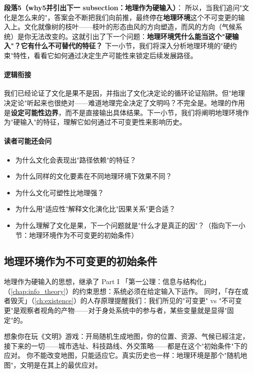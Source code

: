 \documentclass[../main.tex]{subfiles}
\begin{document}
	\textbf{段落5（why5并引出下一 subsection：地理作为硬输入）}：  
	所以，当我们追问"文化是怎么来的"，答案会不断把我们向前推，最终停在\textbf{地理环境}这个不可变更的输入上。文化就像树的枝叶——枝叶的形态由风的方向塑造，而风的方向（气候系统）是你无法改变的。这就引出了下一个问题：\textbf{地理环境凭什么能当这个"硬输入"？它有什么不可替代的特征？} 下一小节，我们将深入分析地理环境的"硬约束"特性，看看它如何通过决定生产可能性来锁定后续发展路径。
	
	\paragraph*{逻辑衔接}
	我们已经论证了文化是果不是因，并指出了文化决定论的循环论证陷阱。但"地理决定论"听起来也很绝对——难道地理完全决定了文明吗？不完全是。地理的作用是\textbf{设定可能性边界}，而不是直接输出具体结果。下一小节，我们将阐明地理环境作为"硬输入"的特征，理解它如何通过不可变更性来影响历史。
	
	\paragraph*{读者可能还会问}
	\begin{itemize}
\item 为什么文化会表现出"路径依赖"的特征？
	\item 为什么同样的文化要素在不同地理环境下效果不同？
	\item 为什么文化可塑性比地理强？
	\item 为什么用"适应性"解释文化演化比"因果关系"更合适？
	\item 为什么理解了文化是果，下一个问题就是"什么才是真正的因"？（指向下一小节：地理环境作为不可变更的初始条件）
\end{itemize}
	
	\subsection{地理环境作为不可变更的初始条件}
	
	

\begin{readingnote}
		地理作为硬输入的思想，继承了 Part I 「第一公理：信息与结构化」（\ref{chap:info_theory}）的约束思想：系统必须在给定输入下运作。
	同时，「存在或者毁灭」（\ref{ch:existence}）的人存原理提醒我们：我们所见的"可变更" vs "不可变更"是观察者视角的产物——对于身处系统中的参与者，某些变量就是显得"固定"的。
\end{readingnote}

\begin{motivation}
				想象你在玩《文明》游戏：开局随机生成地图，你的位置、资源、气候已經注定，接下来的一切——城市选址、科技路线、外交策略——都是在这个"初始条件"下的应对。
		你不能改变地图，只能适应它。真实历史也一样：地理环境是那个"随机地图"，文明是在其上的最优应对。
	\end{motivation}
	
\end{document}
